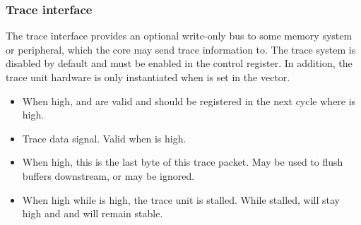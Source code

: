 
\subsubsection{Trace interface}
\label{sec:core-ug-cfg-inst-port-trace}

The trace interface provides an optional write-only bus to some memory system or 
peripheral, which the core may send trace information to. The trace system is 
disabled by default and must be enabled in the  control register. In 
addition, the trace unit hardware is only instantiated when  
is set in the  vector.

\begin{itemize}

\item {}

When high,  and  are valid and should 
be registered in the next cycle where  is high.

\vspace{1em}
\item {}

Trace data signal. Valid when  is high.

\vspace{1em}
\item {}

When high, this is the last byte of this trace packet. May be used to flush 
buffers downstream, or may be ignored.

\vspace{1em}
\item {}

When high while  is high, the trace unit is stalled. While 
stalled,  will stay high and  and 
 will remain stable.

\end{itemize}


